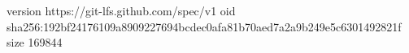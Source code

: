 version https://git-lfs.github.com/spec/v1
oid sha256:192bf24176109a8909227694bcdec0afa81b70aed7a2a9b249e5c6301492821f
size 169844
